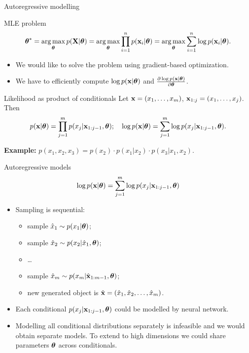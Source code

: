 \begin{frame}{Autoregressive modelling}
    \begin{block}{MLE problem}
	    \vspace{-0.7cm}
	    \[
	        \boldsymbol{\theta}^* = \operatorname*{arg\,max}_{\boldsymbol{\theta}} p(\mathbf{X} | \boldsymbol{\theta}) = \operatorname*{arg\,max}_{\boldsymbol{\theta}} \prod_{i=1}^n p(\mathbf{x}_i | \boldsymbol{\theta}) = \operatorname*{arg\,max}_{\boldsymbol{\theta}} \sum_{i=1}^n \log p(\mathbf{x}_i | \boldsymbol{\theta}).
	    \]
	    \vspace{-0.5cm}
    \end{block}
    \begin{itemize}
        \item We would like to solve the problem using gradient-based optimization.
        \item We have to efficiently compute $\log p(\mathbf{x} | \boldsymbol{\theta})$ and $\frac{\partial \log p(\mathbf{x} | \boldsymbol{\theta})}{\partial \boldsymbol{\theta}}$.
    \end{itemize}
    \begin{block}{Likelihood as product of conditionals}
    Let $\mathbf{x} = (x_1, \dots, x_m)$, $\mathbf{x}_{1:j} = (x_1, \dots, x_j)$. Then 
    \[
        p(\mathbf{x} | \boldsymbol{\theta}) = \prod_{j=1}^m p(x_j | \mathbf{x}_{1:j - 1}, \boldsymbol{\theta}); \quad 
        \log p(\mathbf{x} | \boldsymbol{\theta}) = \sum_{j=1}^m \log p(x_j | \mathbf{x}_{1:j - 1}, \boldsymbol{\theta}).
    \]
    \end{block}
	\textbf{Example:} $p(x_1, x_2, x_3) = p(x_2) \cdot p(x_1 | x_2) \cdot p(x_3 | x_1, x_2)$.
\end{frame}
\begin{frame}{Autoregressive models}
    \[
    \log p(\mathbf{x}| \boldsymbol{\theta}) = \sum_{j=1}^m \log p(x_j | \mathbf{x}_{1:j - 1}, \boldsymbol{\theta})
    \]
    \begin{itemize}
	    \item Sampling is sequential:
	    \begin{itemize}
    		\item sample $\hat{x}_1 \sim p(x_1 | \boldsymbol{\theta})$;
    		\item sample $\hat{x}_2 \sim p(x_2 | \hat{x}_1, \boldsymbol{\theta})$;
    		\item \dots
    		\item sample $\hat{x}_m \sim p(x_m | \hat{\mathbf{x}}_{1:m-1}, \boldsymbol{\theta})$;
    		\item new generated object is $\hat{\mathbf{x}} = (\hat{x}_1, \hat{x}_2, \dots, \hat{x}_m)$.
    	\end{itemize}
        \item Each conditional $p(x_j | \mathbf{x}_{1:j - 1}, \boldsymbol{\theta})$ could be modelled by neural network.
        \item Modelling all conditional distributions separately is infeasible and we would obtain separate models. To extend to high dimensions we could share parameters $\boldsymbol{\theta}$ across conditionals.

    \end{itemize}
\end{frame}
